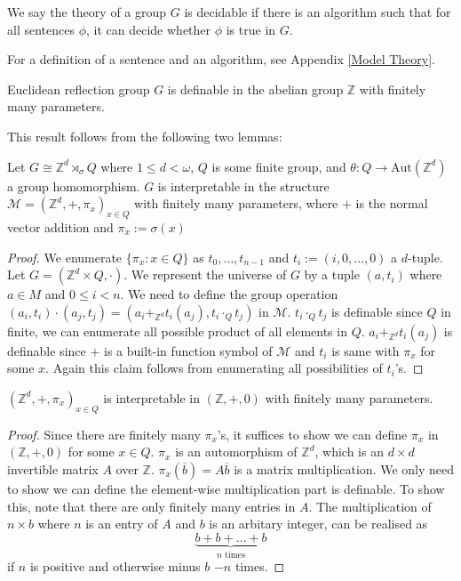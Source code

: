 \documentclass[../main.tex]{subfiles}
\begin{document}
\begin{definition}
    We say the theory of a group $G$ is decidable if there is an algorithm such that for all sentences $\phi$, it can decide whether $\phi$ is true in $G$.
\end{definition}

For a definition of a sentence and an algorithm, see Appendix \ref{Model Theory}.

\begin{proposition}
\label{thm:interp}
    Euclidean reflection group $G$ is definable in the abelian group $\mathbb Z$ with finitely many parameters.
\end{proposition}

This result follows from the following two lemmas:

\begin{lemma}
    Let $G \cong \mathbb Z^d \rtimes_{\sigma} Q$ where $1\leq d < \omega$, $Q$ is some finite group, and $\theta : Q \rightarrow \text{Aut}(\mathbb Z^d)$ a group homomorphism. $G$ is interpretable in the structure $\mathcal M = (\mathbb Z^d, +, \pi_x)_{x \in Q}$ with finitely many parameters, where $+$ is the normal vector addition and $\pi_x := \sigma(x)$
\end{lemma}

\begin{proof}
    We enumerate $\{\pi_x : x\in Q\}$ as $t_0,\dots,t_{n-1}$ and $t_i := (i,0,\dots,0)$ a $d$-tuple. Let $G=(\mathbb Z^d \times Q,\cdot)$. We represent the universe of $G$ by a tuple $(a,t_i)$ where $a\in M$ and $0\leq i < n$. We need to define the group operation $(a_i,t_i)\cdot(a_j,t_j)=(a_i +_{\mathbb Z^d} t_i(a_j), t_i \cdot_Q t_j)$ in $\mathcal M$. $t_i \cdot_Q t_j$ is definable since $Q$ in finite, we can enumerate all possible product of all elements in $Q$. $a_i +_{\mathbb Z^d} t_i(a_j)$ is definable since $+$ is a built-in function symbol of $\mathcal M$ and $t_i$ is same with $\pi_x$ for some $x$. Again this claim follows from enumerating all possibilities of $t_i$'s.
\end{proof}

\begin{lemma}
    $(\mathbb Z^d, +, \pi_x)_{x \in Q}$ is interpretable in $(\mathbb Z, +, 0)$ with finitely many parameters.
\end{lemma}

\begin{proof}
    Since there are finitely many $\pi_x$'s, it suffices to show we can define $\pi_x$ in $(\mathbb Z, +, 0)$ for some $x\in Q$. $\pi_x$ is an automorphism of $\mathbb Z^d$, which is an $d\times d$ invertible matrix $A$ over $\mathbb Z$.
    $\pi_x(\overline b)=A\overline b$ is a matrix multiplication. We only need to show we can define the element-wise multiplication part is definable. To show this, note that there are only finitely many entries in $A$. The multiplication of $n\times b$ where $n$ is an entry of $A$ and $b$ is an arbitary integer, can be realised as \[
    \underbrace{b+b+\dots+b}_\text{$n$ times}
    \]
    if $n$ is positive and otherwise minus $b$ $-n$ times.
\end{proof}
\end{document}
